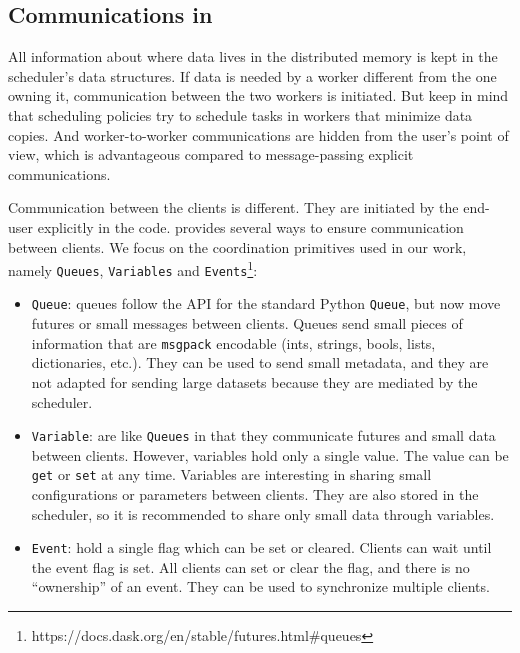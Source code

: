 \subsection{Communications in \dask}
All information about where data lives in the distributed memory is kept in the scheduler's data structures. If data is needed by a worker different from the one owning it, communication between the two workers is initiated. But keep in mind that \dask scheduling policies try to schedule tasks in workers that minimize data copies. 
And worker-to-worker communications are hidden from the user's point of view, which is advantageous compared to message-passing explicit communications.

Communication between the clients is different. They are initiated by the end-user explicitly in the code. \dask provides several ways to ensure communication between clients. We focus on the coordination primitives used in our work, namely \texttt{Queues}, \texttt{Variables} and \texttt{Events}\footnote{https://docs.dask.org/en/stable/futures.html\#queues}: 

\begin{itemize}
    \item \texttt{Queue}: \dask queues follow the API for the standard Python \texttt{Queue}, but now move futures or small messages between clients. Queues send small pieces of information that are \texttt{msgpack} encodable (ints, strings, bools, lists, dictionaries, etc.). They can be used to send small metadata, and they are not adapted for sending large datasets because they are mediated by the scheduler.
    
    \item \texttt{Variable}: are like \texttt{Queues} in that they communicate futures and small data between clients. However, variables hold only a single value. The value can be \texttt{get} or \texttt{set} at any time. Variables are interesting in sharing small configurations or parameters between clients. They are also stored in the scheduler, so it is recommended to share only small data through variables.
    
    \item \texttt{Event}: hold a single flag which can be set or cleared. Clients can wait until the event flag is set. All clients can set or clear the flag, and there is no “ownership” of an event. They can be used to synchronize multiple clients.
\end{itemize}



